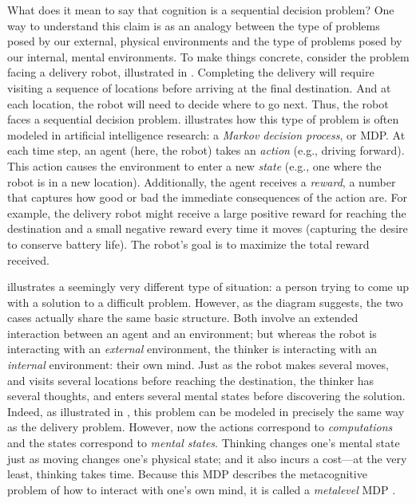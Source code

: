 \documentclass[11pt,a4paperpaper,]{article}
\begin{document}
What does it mean to say that cognition is a sequential decision problem? One way to understand this claim is as an analogy between the type of problems posed by our external, physical environments and the type of problems posed by our internal, mental environments. To make things concrete, consider the problem facing a delivery robot, illustrated in . Completing the delivery will require visiting a sequence of locations before arriving at the final destination. And at each location, the robot will need to decide where to go next. Thus, the robot faces a sequential decision problem.  illustrates how this type of problem is often modeled in artificial intelligence research: a \emph{Markov decision process}, or MDP. At each time step, an agent (here, the robot) takes an \emph{action} (e.g., driving forward). This action causes the environment to enter a new \emph{state} (e.g., one where the robot is in a new location). Additionally, the agent receives a \emph{reward}, a number that captures how good or bad the immediate consequences of the action are. For example, the delivery robot might receive a large positive reward for reaching the destination and a small negative reward every time it moves (capturing the desire to conserve battery life). The robot's goal is to maximize the total reward received.

 illustrates a seemingly very different type of situation: a person trying to come up with a solution to a difficult problem. However, as the diagram suggests, the two cases actually share the same basic structure. Both involve an extended interaction between an agent and an environment; but whereas the robot is interacting with an \emph{external} environment, the thinker is interacting with an \emph{internal} environment: their own mind. Just as the robot makes several moves, and visits several locations before reaching the destination, the thinker has several thoughts, and enters several mental states before discovering the solution. Indeed, as illustrated in , this problem can be modeled in precisely the same way as the delivery problem. However, now the actions correspond to \emph{computations} and the states correspond to \emph{mental states}. Thinking changes one's mental state just as moving changes one's physical state; and it also incurs a cost---at the very least, thinking takes time. Because this MDP describes the metacognitive problem of how to interact with one's own mind, it is called a \emph{metalevel} MDP \citep{hay2016principles}.
\end{document}
